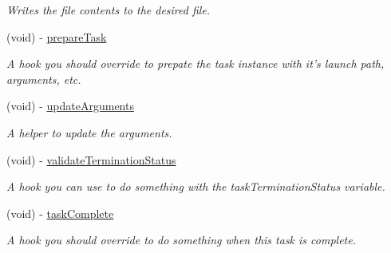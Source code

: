 \begin{DoxyCompactItemize}
\begin{DoxyCompactList}\small\item\em Writes the file contents to the desired file. \item\end{DoxyCompactList}\item 
\hypertarget{interface_g_d_base_n_s_task_operation_ade347d56a2348f7c1259d859759e6417}{
(void) -\/ \hyperlink{interface_g_d_base_n_s_task_operation_ade347d56a2348f7c1259d859759e6417}{prepareTask}}
\label{interface_g_d_base_n_s_task_operation_ade347d56a2348f7c1259d859759e6417}

\begin{DoxyCompactList}\small\item\em A hook you should override to prepate the task instance with it's launch path, arguments, etc. \item\end{DoxyCompactList}\item 
(void) -\/ \hyperlink{interface_g_d_base_n_s_task_operation_afc56ea01eb11b30932f054a482b9c1e0}{updateArguments}
\begin{DoxyCompactList}\small\item\em A helper to update the arguments. \item\end{DoxyCompactList}\item 
\hypertarget{interface_g_d_base_n_s_task_operation_adaa42759ac0e0af2598864b895ecad09}{
(void) -\/ \hyperlink{interface_g_d_base_n_s_task_operation_adaa42759ac0e0af2598864b895ecad09}{validateTerminationStatus}}
\label{interface_g_d_base_n_s_task_operation_adaa42759ac0e0af2598864b895ecad09}

\begin{DoxyCompactList}\small\item\em A hook you can use to do something with the taskTerminationStatus variable. \item\end{DoxyCompactList}\item 
(void) -\/ \hyperlink{interface_g_d_base_n_s_task_operation_acd63f4b69b6774566cee0b95ffc1c71a}{taskComplete}
\begin{DoxyCompactList}\small\item\em A hook you should override to do something when this task is complete. \item\end{DoxyCompactList}\end{DoxyCompactItemize}
